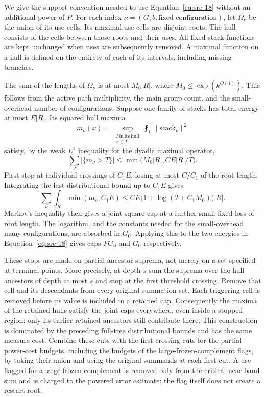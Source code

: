 We give the support convention needed to use
Equation~\eqref{eq:src-18} without an additional power of $P$.
For each index $\nu=(G,b,\text{fixed configuration})$, let
$\Omega_\nu$ be the union of its use cells.  Its maximal use cells
are disjoint roots.  The hull consists of the cells between those
roots and their uses.  All fixed stack functions are kept unchanged
when uses are subsequently removed.  A maximal function on a hull
is defined on the entirety of each of its intervals, including
missing branches.

The sum of the lengths of $\Omega_\nu$ is at most $M_0|R|$, where
$M_0\le\exp(k^{O(1)})$.  This follows from the active path
multiplicity, the main group count, and the small-overhead number of
configurations.  Suppose one family of stacks has total energy at
most $E|R|$.  Its squared hull maxima
\[
 m_\nu(x)=\sup_{\substack{I\ \mathrm{in\ its\ hull}\\x\in I}}
                       \fint_I\|\mathrm{stack}_\nu\|^2
\]
satisfy, by the weak $L^1$ inequality for the dyadic maximal operator,
\[
 \sum_\nu|\{m_\nu>T\}|
 \le\min\bigl(M_0|R|,CE|R|/T\bigr).
\]
First stop at individual crossings of $C_1E$, losing at most
$C/C_1$ of the root length.  Integrating the last distributional
bound up to $C_1E$ gives
\[
 \sum_\nu\int_R\min(m_\nu,C_1E)
 \le CE\bigl(1+\log(2+C_1M_0)\bigr)|R|.
\]
Markov's inequality then gives a joint square cap at a further
small fixed loss of root length.  The logarithm, and the constants
needed for the small-overhead many configurations, are absorbed in
$G_0$.  Applying this to the two energies in
Equation~\eqref{eq:src-18} gives caps $PG_0$ and $G_0$ respectively.

These stops are made on partial ancestor suprema, not merely on a
set specified at terminal points.  More precisely, at depth $s$
sum the suprema over the hull ancestors of depth at most $s$ and
stop at the first threshold crossing.  Remove that cell and its
descendants from every original summation set.  Each triggering
cell is removed before its value is included in a retained cap.
Consequently the maxima of the retained hulls satisfy the joint
caps everywhere, even inside a stopped region: only its earlier
retained ancestors still contribute there.  This construction is
dominated by the preceding full-tree distributional bounds and
has the same measure cost.  Combine these cuts with the first-crossing
cuts for the partial power-cost budgets, including the budgets of the
large-frozen-complement flags, by taking their union and using the
original summands at each first cut.  A use flagged for a large frozen
complement is removed only from the critical near-band sum and is
charged to the powered error estimate; the flag itself does not create
a restart root.

